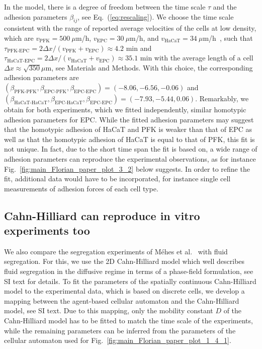 \documentclass[10pt,letterpaper]{article}
\renewcommand{\eqref}[1]{Eq.~(\ref{eq:#1})}
\newcommand{\figref}[1]{Fig.~\ref{fig:#1}}
\begin{document}
In the model, there is a degree of freedom between the time scale
$\tau$ and the adhesion parameters $\beta_{ij}$, see
\eqref{rescaling}. We choose the time scale consistent with the range
of reported average velocities of the cells at low density, which are
$v_\text{PFK}=500~\mu$m/h, $v_\text{EPC}= 30~\mu$m/h, and
$v_\text{HaCaT}=34~\mu$m/h~\cite{MehMonNemVic2012}, such that
$\tau_\text{PFK-EPC} = 2 \Delta x/(v_\text{PFK}+v_\text{EPC}) \approx
4.2$ min and
$\tau_\text{HaCaT-EPC} = 2 \Delta x/(v_\text{HaCaT}+v_\text{EPC})
\approx 35.1$ min with the average length of a cell
$\Delta x \approx \sqrt{350}\mu \text{m}$, see Materials and Methods. With
this choice, the corresponding adhesion parameters are
$(\beta_\text{PFK-PFK},\beta_\text{EPC-PFK},\beta_\text{EPC-EPC})=(-8.06,-6.56,-0.06)$
and
$(\beta_\text{HaCaT-HaCaT},\beta_\text{EPC-HaCaT},\beta_\text{EPC-EPC})=(-7.93,-5.44,0.06)$.
Remarkably, we obtain for both experiments, which we fitted
independently, similar homotypic adhesion parameters for EPC. While
the fitted adhesion parameters may suggest that the homotypic adhesion
of HaCaT and PFK is weaker than that of EPC as well as that the
homotypic adhesion of HaCaT is equal to that of PFK, this fit is not
unique. In fact, due to the short time span the fit is based on, a
wide range of adhesion parameters can reproduce the experimental
observations, as for instance \figref{main_Florian_paper_plot_3_2} below suggests. In
order to refine the fit, additional
data would have to be incorporated, for instance single cell
measurements of adhesion forces of each cell type.

\subsection*{Cahn-Hilliard can reproduce in vitro experiments too}

We also compare the segregation experiments of Méhes et al.~\cite{MehMonNemVic2012}
with fluid segregation. For this, we use the 2D
Cahn-Hilliard model which well describes fluid segregation in the
diffusive regime in terms of a phase-field formulation, see SI text for
details. To fit the parameters of the spatially continuous
Cahn-Hilliard model to the experimental data, which is based on
discrete cells, we develop a mapping between the agent-based cellular
automaton and the Cahn-Hilliard model, see SI text. Due to this mapping,
only the mobility constant $D$ of the Cahn-Hilliard model has to be
fitted to match the time scale of the experiments, while the remaining
parameters can be inferred from the parameters of the cellular
automaton used for \figref{main_Florian_paper_plot_1_4_1}.
\end{document}
